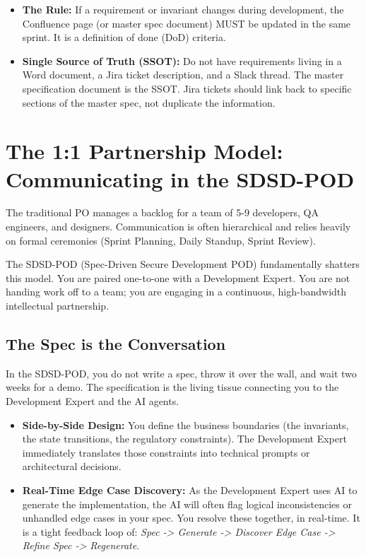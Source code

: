 \documentclass[
  11pt,
  openany,
  oneside]{book}
\providecommand{\tightlist}{%
  \setlength{\itemsep}{0pt}\setlength{\parskip}{0pt}}
\begin{document}
\begin{itemize}
\tightlist
\item
  \textbf{The Rule:} If a requirement or invariant changes during
  development, the Confluence page (or master spec document) MUST be
  updated in the same sprint. It is a definition of done (DoD) criteria.
\item
  \textbf{Single Source of Truth (SSOT):} Do not have requirements
  living in a Word document, a Jira ticket description, and a Slack
  thread. The master specification document is the SSOT. Jira tickets
  should link back to specific sections of the master spec, not
  duplicate the information.
\end{itemize}

\bigskip

\section{The 1:1 Partnership Model: Communicating in the
SDSD-POD}\label{the-11-partnership-model-communicating-in-the-sdsd-pod}

The traditional PO manages a backlog for a team of 5-9 developers, QA
engineers, and designers. Communication is often hierarchical and relies
heavily on formal ceremonies (Sprint Planning, Daily Standup, Sprint
Review).

The SDSD-POD (Spec-Driven Secure Development POD) fundamentally shatters
this model. You are paired one-to-one with a Development Expert. You are
not handing work off to a team; you are engaging in a continuous,
high-bandwidth intellectual partnership.

\subsection{The Spec is the
Conversation}\label{the-spec-is-the-conversation}

In the SDSD-POD, you do not write a spec, throw it over the wall, and
wait two weeks for a demo. The specification is the living tissue
connecting you to the Development Expert and the AI agents.

\begin{itemize}
\tightlist
\item
  \textbf{Side-by-Side Design:} You define the business boundaries (the
  invariants, the state transitions, the regulatory constraints). The
  Development Expert immediately translates those constraints into
  technical prompts or architectural decisions.
\item
  \textbf{Real-Time Edge Case Discovery:} As the Development Expert uses
  AI to generate the implementation, the AI will often flag logical
  inconsistencies or unhandled edge cases in your spec. You resolve
  these together, in real-time. It is a tight feedback loop of:
  \emph{Spec -\textgreater{} Generate -\textgreater{} Discover Edge Case
  -\textgreater{} Refine Spec -\textgreater{} Regenerate}.
\end{itemize}
\end{document}
